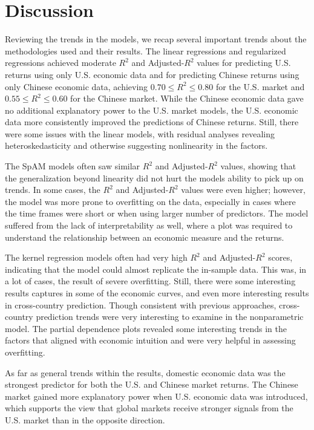 \chapter{Discussion}

Reviewing the trends in the models, we recap several important trends about the methodologies used and their results. The linear regressions and regularized regressions achieved moderate $R^2$ and Adjusted-$R^2$ values for predicting U.S. returns using only U.S. economic data and for predicting Chinese returns using only Chinese economic data, achieving $0.70\leq R^2\leq 0.80$ for the U.S. market and $0.55\leq R^2\leq 0.60$ for the Chinese market. While the Chinese economic data gave no additional explanatory power to the U.S. market models, the U.S. economic data more consistently improved the predictions of Chinese returns. Still, there were some issues with the linear models, with residual analyses revealing heteroskedasticity and otherwise suggesting nonlinearity in the factors.

The SpAM models often saw similar $R^2$ and Adjusted-$R^2$ values, showing that the generalization beyond linearity did not hurt the models ability to pick up on trends. In some cases, the $R^2$ and Adjusted-$R^2$ values were even higher; however, the model was more prone to overfitting on the data, especially in cases where the time frames were short or when using larger number of predictors. The model suffered from the lack of interpretability as well, where a plot was required to understand the relationship between an economic measure and the returns.

The kernel regression models often had very high $R^2$ and Adjusted-$R^2$ scores, indicating that the model could almost replicate the in-sample data. This was, in a lot of cases, the result of severe overfitting. Still, there were some interesting results captures in some of the economic curves, and even more interesting results in cross-country prediction. Though consistent with previous approaches, cross-country prediction trends were very interesting to examine in the nonparametric model. The partial dependence plots revealed some interesting trends in the factors that aligned with economic intuition and were very helpful in assessing overfitting. 

As far as general trends within the results, domestic economic data was the strongest predictor for both the U.S. and Chinese market returns. The Chinese market gained more explanatory power when U.S. economic data was introduced, which supports the view that global markets receive stronger signals from the U.S. market than in the opposite direction.

